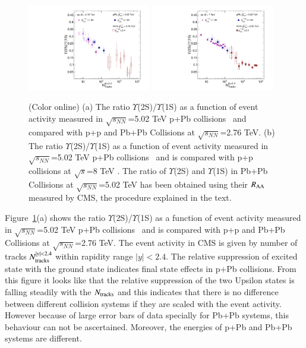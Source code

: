 \begin{figure}
  \begin{center}
    \includegraphics[width=0.48\textwidth]{Figures/Fig12a_LHC_Y2SByY1S_NTrk.pdf}
    \includegraphics[width=0.48\textwidth]{Figures/Fig12b_LHC_Y2SByY1S_NTrk.pdf}
\caption{(Color online)
  (a) The ratio $\Upsilon$(2S)/$\Upsilon$(1S) as a function of event activity measured in 
$\sqrt{s_{NN}}$=5.02 TeV p+Pb collisions~\cite{CMS:2013jsu} and compared with p+p
and Pb+Pb Collisions at $\sqrt{s_{NN}}$=2.76 TeV.
(b) The ratio $\Upsilon$(2S)/$\Upsilon$(1S) as a function of event activity measured in 
$\sqrt{s_{NN}}$=5.02 TeV p+Pb collisions~\cite{CMS:2013jsu} and is compared with p+p
collisions at $\sqrt{s}$=8 TeV \cite{CMS:2020fae}.
The ratio of $\Upsilon$(2S) and $\Upsilon$(1S) in Pb+Pb Collisions at
$\sqrt{s_{NN}}$=5.02 TeV has been obtained using their $R_{\rm AA}$ measured by CMS, 
the procedure explained in the text.
}
\label{fig:UpsilonpPb}
\end{center}
\end{figure}





Figure~\ref{fig:UpsilonpPb}(a) shows
the ratio $\Upsilon$(2S)/$\Upsilon$(1S) as a function of event activity measured in 
$\sqrt{s_{NN}}$=5.02 TeV p+Pb collisions~\cite{CMS:2013jsu} and is compared with p+p
and Pb+Pb Collisions at $\sqrt{s_{NN}}$=2.76 TeV.
The event activity in CMS is given by number of tracks $N_{\rm tracks}^{|y|<2.4}$ within rapidity
range $|y|<2.4$.
The relative suppression of excited state with the ground state indicates final
state effects in p+Pb collisions. 
From this figure it looks like that the relative suppression of
the two Upsilon states is falling steadily with the $N_{\rm tracks}$  and
this indicates that there is no difference between different collision systems if
they are scaled with the event activity. However because of large error bars
of data specially for Pb+Pb systems, this behaviour can not be ascertained.
Moreover, the energies of p+Pb and Pb+Pb systems are different.

